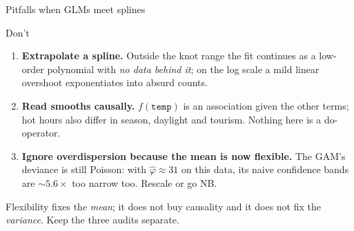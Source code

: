 \documentclass[aspectratio=169,11pt]{beamer}
\begin{document}
\begin{frame}{Pitfalls when GLMs meet splines}
  \begin{alertblock}{Don't}
    \begin{enumerate}
      \item \textbf{Extrapolate a spline.} Outside the knot range the fit continues as
            a low-order polynomial with \emph{no data behind it}; on the log scale a
            mild linear overshoot exponentiates into absurd counts.
      \item \textbf{Read smooths causally.} $f(\texttt{temp})$ is an association given
            the other terms; hot hours also differ in season, daylight and tourism.
            Nothing here is a do-operator.
      \item \textbf{Ignore overdispersion because the mean is now flexible.} The GAM's
            deviance is still Poisson: with $\hat\varphi \approx 31$ on this data, its
            naive confidence bands are $\sim\!5.6\times$ too narrow too. Rescale or go NB.
    \end{enumerate}
  \end{alertblock}
  \begin{takeaway}
    Flexibility fixes the \emph{mean}; it does not buy causality and it does not fix
    the \emph{variance}. Keep the three audits separate.
  \end{takeaway}
\end{frame}
\end{document}
